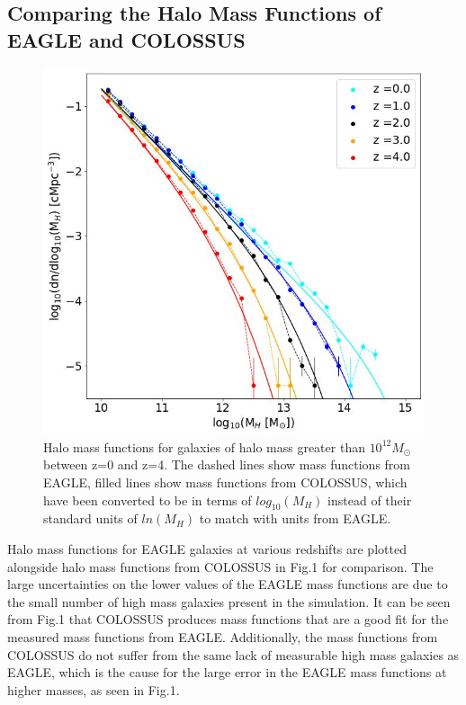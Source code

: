 \documentclass[12pt, twocolumn]{report}%
\begin{document}
\subsection{Comparing the Halo Mass Functions of EAGLE and COLOSSUS}

\begin{figure}[H]
\centering
\includegraphics[width=\linewidth]{Mass_Function.jpeg}
\caption{Halo mass functions for galaxies of halo mass greater than $10^{12}M_\odot$ between z=0 and z=4. The dashed lines show mass functions from EAGLE, filled lines show mass functions from COLOSSUS, which have been converted to be in terms of $log_{10}(M_H)$ instead of their standard units of $ln(M_H)$ to match with units from EAGLE.}
\label{fig:1}
\end{figure}

Halo mass functions for EAGLE galaxies at various redshifts are plotted alongside halo mass functions from COLOSSUS in Fig.1 for comparison. The large uncertainties on the lower values of the EAGLE mass functions are due to the small number of high mass galaxies present in the simulation. It can be seen from Fig.1 that COLOSSUS produces mass functions that are a good fit for the measured mass functions from EAGLE. Additionally, the mass functions from COLOSSUS do not suffer from the same lack of measurable high mass galaxies as EAGLE, which is the cause for the large error in the EAGLE mass functions at higher masses, as seen in Fig.1.\par
\end{document}
